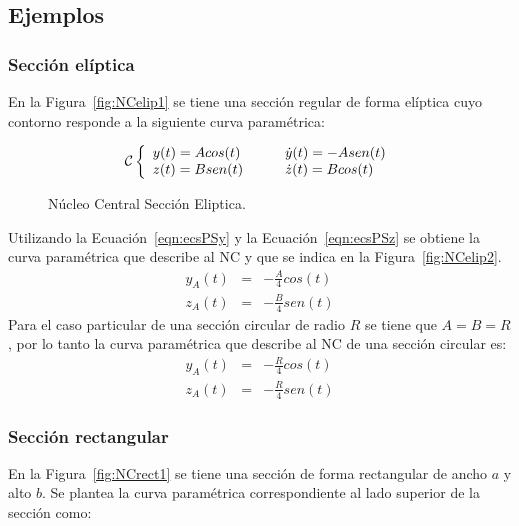 \subsection{Ejemplos}

\subsubsection{Sección elíptica}

En la Figura~\ref{fig:NCelip1} se tiene una sección regular de forma elíptica cuyo contorno responde a la siguiente curva paramétrica:

\begin{equation}
\mcC %
\left\{
\begin{array}{l} y(t)=Acos(t) \\ z(t)=Bsen(t) \end{array}
\qquad
\begin{array}{l} \dot{y}(t)=-Asen(t) \\ \dot{z}(t)=Bcos(t) \end{array}
\right.
\end{equation}

\begin{figure}[htb]
	\centering
{}
\hspace{0.1\textwidth}
\caption{Núcleo Central Sección Eliptica.}
	\label{fig:NCelip}
\end{figure}

Utilizando la Ecuación~\eqref{eqn:ecsPSy} y la Ecuación~\eqref{eqn:ecsPSz} se obtiene la curva paramétrica que describe al NC y que se indica en la Figura~\ref{fig:NCelip2}.
\begin{eqnarray}
y_A(t) &=& - \frac{A}{4} cos(t) \\
z_A(t) &=& - \frac{B}{4} sen(t)
\end{eqnarray}
Para el caso particular de una sección circular de radio $R$ se tiene que $A=B=R$, por lo tanto la curva paramétrica que describe al NC de una sección circular es:
\begin{eqnarray}
y_A(t) &=& - \frac{R}{4} cos(t) \\
z_A(t) &=& - \frac{R}{4} sen(t)
\end{eqnarray}

\subsubsection{Sección rectangular}
%
En la Figura~\ref{fig:NCrect1} se tiene una sección de forma rectangular de ancho $a$ y alto $b$. Se plantea la curva paramétrica correspondiente al lado superior de la sección como:

